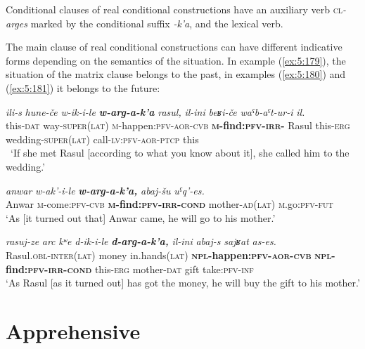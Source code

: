 ﻿\documentclass[output=paper]{langsci/langscibook}
\begin{document}
Conditional clauses of real conditional constructions have an auxiliary
verb \textsc{cl}\emph{-arges} marked by the conditional suffix \emph{-k'a}, and the
lexical verb.

The main clause of real conditional constructions can have different
indicative forms depending on the semantics of the situation. In example
(\ref{ex:5:179}), the situation of the matrix clause belongs to the past, in
examples (\ref{ex:5:180}) and (\ref{ex:5:181}) it belongs to the future:

\ea \label{ex:5:179} %
\gll \emph{ili-s} \emph{hune-če} \emph{w-ik-i-le} \emph{\textbf{w-arg-a-k'a}} \emph{rasul,} \emph{il-ini} \emph{beʁi-če} \emph{waˤb-aˤt-ur-i} \emph{il.}\\
 this-\textsc{dat} way-\textsc{super}(\textsc{lat}) \textsc{m}-happen:\textsc{pfv}-\textsc{aor}-\textsc{cvb} \textbf{\textsc{m}-find:\textsc{pfv}-\textsc{irr}-} Rasul this-\textsc{erg} wedding-\textsc{super}(\textsc{lat}) call-\textsc{lv}:\textsc{pfv}-\textsc{aor}-\textsc{ptcp} this\\\
\glt `If she met Rasul [according to what you know about it], she called
him to the wedding.'

\ex \label{ex:5:180} %
\gll \emph{anwar} \emph{w-ak'-i-le} \emph{\textbf{w-arg-a-k'a,}} \emph{abaj-šu} \emph{uˤq'-es.}\\
 Anwar \textsc{m}-come:\textsc{pfv}-\textsc{cvb} \textbf{\textsc{m}-find:\textsc{pfv}-\textsc{irr}-\textsc{cond}} mother-\textsc{ad}(\textsc{lat}) \textsc{m}.go:\textsc{pfv}-\textsc{fut}\\
\glt `As [it turned out that] Anwar came, he will go to his mother.'

\ex \label{ex:5:181} %
\gll \emph{rasuj-ze} \emph{arc} \emph{kʷe} \emph{d-ik-i-le} \emph{\textbf{d-arg-a-k'a,}} \emph{il-ini} \emph{abaj-s} \emph{sajʁat} \emph{as-es.}\\
 Rasul.\textsc{obl}-\textsc{inter}(\textsc{lat}) money in.hands(\textsc{lat}) \textbf{\textsc{npl}-happen:\textsc{pfv}-\textsc{aor}-\textsc{cvb}} \textbf{\textsc{npl}-find:\textsc{pfv}-\textsc{irr}-\textsc{cond}} this-\textsc{erg} mother-\textsc{dat} gift take:\textsc{pfv}-\textsc{inf}\\
\glt `As Rasul [as it turned out] has got the money, he will buy the gift
to his mother.'
\z

\removelastskip
{}

\section{Apprehensive}\label{apprehensive}
\end{document}
